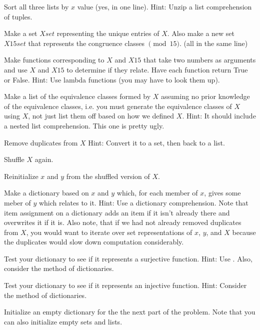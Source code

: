 \begin{problem}
\item Sort all three lists by $x$ value (yes, in one line).
Hint: Unzip a list comprehension of tuples.

\item Make a set $Xset$ representing the unique entries of $X$.
Also make a new set $X15set$ that represents the congruence classes $\pmod 15$. (all in the same line)

\item Make functions corresponding to $X$ and $X15$ that take two numbers as arguments and use $X$ and $X15$ to determine if they relate.
Have each function return True or False.
Hint: Use lambda functions (you may have to look them up).

\item Make a list of the equivalence classes formed by $X$ assuming no prior knowledge of the equivalence classes, i.e. you must generate the equivalence classes of $X$ using $X$, not just list them off based on how we defined $X$.
Hint: It should include a nested list comprehension.
This one is pretty ugly.

\item Remove duplicates from $X$
Hint: Convert it to a set, then back to a list.

\item Shuffle $X$ again. 

\item Reinitialize $x$ and $y$ from the shuffled version of $X$.

\item Make a dictionary based on $x$ and $y$ which, for each member of $x$, gives some meber of $y$ which relates to it.
Hint: Use a dictionary comprehension.
Note that item assignment on a dictionary adds an item if it isn't already there and overwrites it if it is.
Also note, that if we had not already removed duplicates from $X$, you would want to iterate over set representations of $x$, $y$, and $X$ because the duplicates would slow down computation considerably.

\item Test your dictionary to see if it represents a surjective function.
Hint: Use .
Also, consider the  method of dictionaries.

\item Test your dictionary to see if it represents an injective function.
Hint: Consider the  method of dictionaries.

\item Initialize an empty dictionary for the the next part of the problem.
Note that you can also initialize empty sets and lists.


\end{problem}
